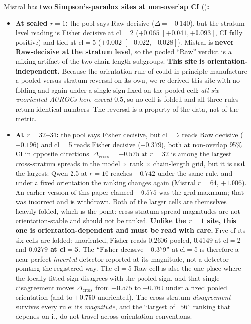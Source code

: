 \documentclass[10pt, letterpaper]{article}
\newcommand{\Dcross}{\Delta_{\text{cross}}}
\begin{document}
Mistral has \textbf{two Simpson's-paradox sites at non-overlap CI}
()\textbf{:}
\begin{itemize}[leftmargin=*, itemsep=2pt, topsep=2pt]
  \item \textbf{At sealed $r=1$:} the pool says Raw decisive ($\Delta
  = -0.140$), but the stratum-level reading is Fisher decisive at
  cl$=$2 ($+0.065$ $[+0.041, +0.093]$, CI fully positive) and tied at
  cl$=$5 ($+0.002$ $[-0.022, +0.028]$). Mistral is \textbf{never
  Raw-decisive at the stratum level}, so the pooled ``Raw'' verdict is
  a mixing artifact of the two chain-length subgroups.
  \textbf{This site is orientation-independent.} Because the orientation
  rule of  could in principle manufacture a
  pooled-versus-stratum reversal on its own, we re-derived this site
  with no folding and again under a single sign fixed on the pooled
  cell: \emph{all six unoriented AUROCs here exceed $0.5$}, so no cell
  is folded and all three rules return identical numbers. The reversal
  is a property of the data, not of the metric.
  \item \textbf{At $r=32$--$34$:} the pool says Fisher decisive, but
  cl$=$2 reads Raw decisive ($-0.196$) and cl$=$5 reads Fisher
  decisive ($+0.379$), both at non-overlap 95\% CI in opposite
  directions. $\Dcross = -0.575$ at $r=32$ is among the largest cross-stratum
  spreads in the model $\times$ rank $\times$ chain-length grid, but it
  is \textbf{not} the largest: Qwen 2.5 at $r=16$ reaches $+0.742$
  under the same rule, and under a fixed orientation the ranking
  changes again (Mistral $r=64$, $+1.006$). An earlier version of this
  paper claimed $-0.575$ was the grid maximum; that was incorrect and
  is withdrawn. Both of the larger cells are themselves heavily folded,
  which is the point: cross-stratum spread magnitudes are not
  orientation-stable and should not be ranked.
  \textbf{Unlike the $r=1$ site, this one is orientation-dependent and
  must be read with care.} Five of its six cells are folded: unoriented,
  Fisher reads $0.2606$ pooled, $0.4149$ at cl$=$2 and \textbf{$0.0279$
  at cl$=$5}. The ``Fisher decisive $+0.379$'' at cl$=$5 is therefore a
  near-perfect \emph{inverted} detector reported at its magnitude, not
  a detector pointing the registered way. The cl$=$5 Raw cell is also
  the one place where the locally fitted sign disagrees with the pooled
  sign, and that single disagreement moves $\Dcross$ from $-0.575$ to
  $-0.760$ under a fixed pooled orientation (and to $+0.760$ unoriented).
  The cross-stratum \emph{disagreement} survives every rule; its
  \emph{magnitude}, and the ``largest of 156'' ranking that depends on
  it, do not travel across orientation conventions.
\end{itemize}
\end{document}
